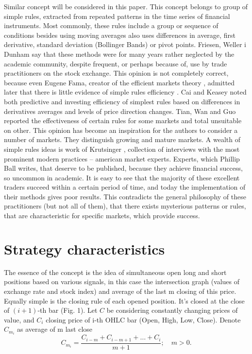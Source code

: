 \documentclass{tewiart}
\begin{document}
Similar concept will be considered in this paper. This concept belongs to group of simple rules, extracted from repeated patterns in the time series of financial instruments. Most commonly, these rules include a group or sequence of conditions besides using moving averages also uses differences in average, first derivative, standard deviation (Bollinger Bands) or pivot points. Friesen, Weller i Dunham \cite{friesen09} say that these methods were for many years rather neglected by the academic community, despite frequent, or perhaps because of, use by trade practitioners on the stock exchange. This opinion is not completely correct, because even Eugene Fama, creator of the efficient markets theory \cite{fama91}, admitted later that  there is little evidence of simple rules efficiency \cite{fama98}. Cai and Keasey \cite{cai05} noted both predictive and investing efficiency of simplest rules based on differences in derivatives averages and levels of price direction changes. Tian, Wan and Guo \cite{tian02} reported the effectiveness of certain rules for some markets and total unsuitable on other. This opinion has become an inspiration for the authors to consider a number of markets. They distinguish growing and mature markets. A wealth of simple rules ideas is work of Krutsinger \cite{krutsinger99}, collection of interviews with the most prominent modern practices – american market experts. Experts, which Phillip Ball \cite{ball07} writes, that deserve to be published, because they achieve financial success, so uncommon in academic.
It is easy to see that the majority of these excellent traders succeed within a certain period of time, and today the implementation of their methods gives poor results. This contradicts the general philosophy of these practitioners (but not all of them), that there exists mysterious patterns or rules, that are characteristic for specific markets, which provide success.
\section{Strategy characteristics}
\indent The essence of the concept is the idea of simultaneous open long and short positions based on various signals, in this case the intersection graph (values of exchange rate  and stock index) and average of the last m closing of this price.\\
Equally simple is the closing rule of each opened position. It's closed at the close of $(i+1)$-th bar (Fig. 1).
Let $C$ be considering constantly changing prices of value, and $C_i$ closing price of i-th OHLC bar (Open, High, Low, Close). Denote $C_{m_{i}}$ as average of m last close
\begin{equation} \label{label-of-equation-1}
  C_{m_{i}} = \frac{C_{i-m} + C_{i-m+1} + … + C_{i}}{m+1}; \hspace{1em}m>0. 
\end{equation}
 
\end{document}
